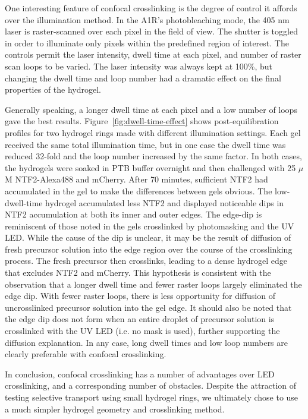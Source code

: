One interesting feature of confocal crosslinking is the degree of control it affords over the illumination method.  In the A1R's photobleaching mode, the 405 nm laser is raster-scanned over each pixel in the field of view.  The shutter is toggled in order to illuminate only pixels within the predefined region of interest.  The controls permit the laser intensity, dwell time at each pixel, and number of raster scan loops to be varied.  The laser intensity was always kept at 100\%, but changing the dwell time and loop number had a dramatic effect on the final properties of the hydrogel.

Generally speaking, a longer dwell time at each pixel and a low number of loops gave the best results.  %
 Figure~\ref{fig:dwell-time-effect} shows post-equilibration profiles for two hydrogel rings made with different illumination settings.  Each gel received the same total illumination time, but in one case the dwell time was reduced 32-fold and the loop number increased by the same factor.  In both cases, the hydrogels were soaked in PTB buffer overnight and then challenged with 25 $\mu$M NTF2-Alexa488 and mCherry.  After 70 minutes, sufficient NTF2 had accumulated in the gel to make the differences between gels obvious.  The low-dwell-time hydrogel accumulated less NTF2 and displayed noticeable dips in NTF2 accumulation at both its inner and outer edges.  The edge-dip is reminiscent of those noted in the gels crosslinked by photomasking and the UV LED.  While the cause of the dip is unclear, it may be the result of diffusion of fresh precursor solution into the edge region over the course of the crosslinking process.  The fresh precursor then crosslinks, leading to a dense hydrogel edge that excludes NTF2 and mCherry.  This hypothesis is consistent with the observation that a longer dwell time and fewer raster loops largely eliminated the edge dip.  With fewer raster loops, there is less opportunity for diffusion of uncrosslinked precursor solution into the gel edge.  It should also be noted that the edge dip does not form when an entire droplet of precursor solution is crosslinked with the UV LED (i.e. no mask is used), further supporting the diffusion explanation.  In any case, long dwell times and low loop numbers are clearly preferable with confocal crosslinking.

In conclusion, confocal crosslinking has a number of advantages over LED crosslinking, and a corresponding number of obstacles.  Despite the attraction of testing selective transport using small hydrogel rings, we ultimately chose to use a much simpler hydrogel geometry and crosslinking method.

